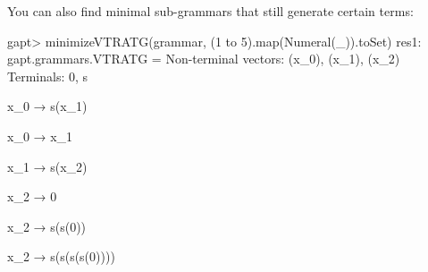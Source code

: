 \documentclass[a4paper,11pt]{book}
\begin{document}
You can also find minimal sub-grammars that still generate certain terms:
\begin{clilisting}
gapt> minimizeVTRATG(grammar, (1 to 5).map(Numeral(_)).toSet)
res1: gapt.grammars.VTRATG =
Non-terminal vectors: (x_0), (x_1), (x_2)
Terminals: 0, s

x_0 → s(x_1)

x_0 → x_1

x_1 → s(x_2)

x_2 → 0

x_2 → s(s(0))

x_2 → s(s(s(s(0))))

\end{clilisting}





\vfill
\pagebreak
\end{document}
